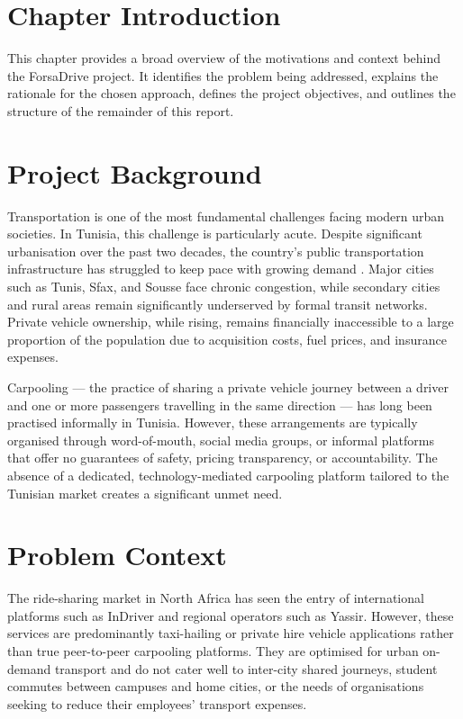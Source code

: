 \documentclass[12pt,a4paper,openright]{report}
\begin{document}
\section*{Chapter Introduction}
This chapter provides a broad overview of the motivations and context behind the ForsaDrive project. It identifies the problem being addressed, explains the rationale for the chosen approach, defines the project objectives, and outlines the structure of the remainder of this report.

\section{Project Background}

Transportation is one of the most fundamental challenges facing modern urban societies. In Tunisia, this challenge is particularly acute. Despite significant urbanisation over the past two decades, the country's public transportation infrastructure has struggled to keep pace with growing demand \cite{worldbank_transport}. Major cities such as Tunis, Sfax, and Sousse face chronic congestion, while secondary cities and rural areas remain significantly underserved by formal transit networks. Private vehicle ownership, while rising, remains financially inaccessible to a large proportion of the population due to acquisition costs, fuel prices, and insurance expenses.

Carpooling --- the practice of sharing a private vehicle journey between a driver and one or more passengers travelling in the same direction --- has long been practised informally in Tunisia. However, these arrangements are typically organised through word-of-mouth, social media groups, or informal platforms that offer no guarantees of safety, pricing transparency, or accountability. The absence of a dedicated, technology-mediated carpooling platform tailored to the Tunisian market creates a significant unmet need.

\section{Problem Context}

The ride-sharing market in North Africa has seen the entry of international platforms such as InDriver and regional operators such as Yassir. However, these services are predominantly taxi-hailing or private hire vehicle applications rather than true peer-to-peer carpooling platforms. They are optimised for urban on-demand transport and do not cater well to inter-city shared journeys, student commutes between campuses and home cities, or the needs of organisations seeking to reduce their employees' transport expenses.
\end{document}
